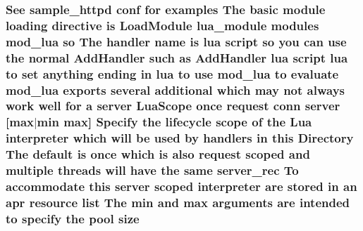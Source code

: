 \subsubsection[{\texorpdfstring{size}{size}}]{\setlength{\rightskip}{0pt plus 5cm}See sample\+\_\+httpd {\bf conf} for examples The basic {\bf module} loading {\bf directive} {\bf is} Load\+Module {\bf lua\+\_\+module} modules mod\+\_\+lua {\bf so} The {\bf handler} {\bf name} {\bf is} lua {\bf script} {\bf so} you {\bf can} use the normal Add\+Handler such {\bf as} Add\+Handler lua {\bf script} lua {\bf to} {\bf set} anything ending {\bf in} lua {\bf to} use mod\+\_\+lua {\bf to} evaluate mod\+\_\+lua exports several additional {\bf which} may {\bf not} always work well for {\bf a} {\bf server} Lua\+Scope {\bf once} {\bf request} {\bf conn} {\bf server} \mbox{[}{\bf max}$\vert${\bf min} {\bf max}\mbox{]} Specify the lifecycle scope {\bf of} the Lua interpreter {\bf which} will {\bf be} {\bf used} by handlers {\bf in} {\bf this} Directory The {\bf default} {\bf is} {\bf once} {\bf which} {\bf is} also {\bf request} scoped and multiple threads will have the same {\bf server\+\_\+rec} To accommodate {\bf this} {\bf server} scoped interpreter {\bf are} stored {\bf in} an apr {\bf resource} {\bf list} The {\bf min} and {\bf max} {\bf arguments} {\bf are} intended {\bf to} specify the {\bf pool} size}\hypertarget{basic-configuration_8txt_a7265e33e9b4221de0d527d97a6e0a9d9}{}\label{basic-configuration_8txt_a7265e33e9b4221de0d527d97a6e0a9d9}
